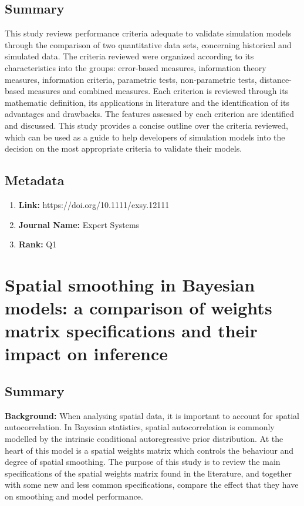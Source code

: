 \documentclass[10pt, oneside]{article}
\begin{document}
\subsection*{Summary}
This study reviews performance criteria adequate to validate simulation models through the comparison of two quantitative
data sets, concerning historical and simulated data. The criteria reviewed were organized according to its characteristics
into the groups: error-based measures, information theory measures, information criteria, parametric tests, non-parametric
tests, distance-based measures and combined measures. Each criterion is reviewed through its mathematic definition, its
applications in literature and the identification of its advantages and drawbacks. The features assessed by each criterion
are identified and discussed. This study provides a concise outline over the criteria reviewed, which can be used as a guide
to help developers of simulation models into the decision on the most appropriate criteria to validate their models.
\cite{hora2015review}

\subsection*{Metadata}
\begin{enumerate}
	\item \textbf{Link:} https://doi.org/10.1111/exsy.12111
	\item \textbf{Journal Name:} Expert Systems
	\item \textbf{Rank:} Q1
\end{enumerate}


\section*{Spatial smoothing in Bayesian models: a comparison of weights matrix specifications and their impact on inference}

\subsection*{Summary}
\textbf{Background:} When analysing spatial data, it is important to account for spatial autocorrelation. In Bayesian statistics,
spatial autocorrelation is commonly modelled by the intrinsic conditional autoregressive prior distribution. At
the heart of this model is a spatial weights matrix which controls the behaviour and degree of spatial smoothing.
The purpose of this study is to review the main specifications of the spatial weights matrix found in the literature,
and together with some new and less common specifications, compare the effect that they have on smoothing and
model performance.
\end{document}
